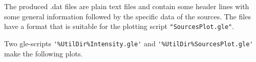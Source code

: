 The produced .dat files are plain text files and contain some header lines with some general information followed by the specific data of the sources. The files have a format that is suitable for the plotting script \verb!"SourcesPlot.gle"!.


Two gle-scripts \verb#'%UtilDir%Intensity.gle'# and \verb#'%UtilDir%SourcesPlot.gle'# make the following plots.

\begin{figure}[h]
\setlength{\unitlength}{.48\textwidth} %

\end{figure}
